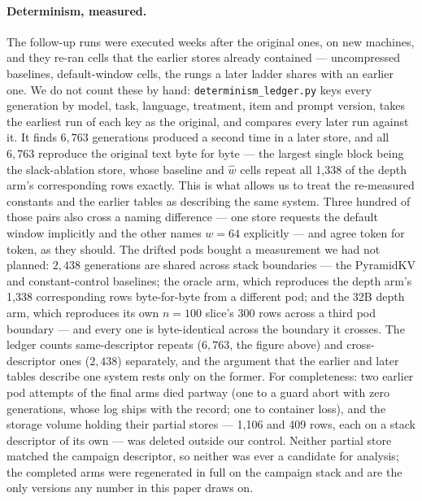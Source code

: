 \documentclass{article}
\begin{document}
\paragraph{Determinism, measured.}
The follow-up runs were executed weeks after the original ones, on new
machines, and they re-ran cells that the earlier stores already
contained --- uncompressed baselines, default-window cells, the rungs a
later ladder shares with an earlier one. We do not count these by hand:
\texttt{determinism\_ledger.py} keys every generation by model, task,
language, treatment, item and prompt version, takes the earliest run of
each key as the original, and compares every later run against it. It
finds $6{,}763$ generations produced a second time in a later store, and
all $6{,}763$ reproduce the original text byte for byte --- the largest
single block being the slack-ablation store, whose baseline and
$\hat w$ cells repeat all 1{,}338 of the depth arm's corresponding
rows exactly. This is what
allows us to treat the re-measured constants and the earlier tables as
describing the same system. Three hundred of those pairs also cross a
naming difference --- one store requests the default window implicitly
and the other names $w{=}64$ explicitly --- and agree token for token, as
they should. The drifted pods bought a measurement we had not
planned: $2{,}438$ generations are shared across stack boundaries ---
the PyramidKV and constant-control baselines; the oracle arm, which
reproduces the depth arm's 1{,}338 corresponding rows byte-for-byte
from a different pod; and the 32B depth arm, which reproduces its own
$n{=}100$ slice's 300 rows across a third pod boundary --- and every
one is byte-identical across the boundary it crosses. The
ledger counts same-descriptor repeats ($6{,}763$, the figure above) and
cross-descriptor ones ($2{,}438$) separately, and the argument that the
earlier and later tables describe one system rests only on the former.
For completeness: two earlier pod attempts of the final arms died
partway (one to a guard abort with zero generations, whose log ships
with the record; one to container loss), and the storage volume holding
their partial stores --- 1{,}106 and 409 rows, each on a stack
descriptor of its own --- was deleted outside our control. Neither
partial store matched the campaign descriptor, so neither was ever a
candidate for analysis; the completed arms were regenerated in full on
the campaign stack and are the only versions any number in this paper
draws on.
\end{document}
